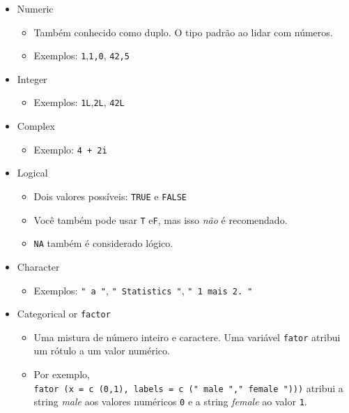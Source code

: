 \documentclass[
]{book}
\providecommand{\tightlist}{%
  \setlength{\itemsep}{0pt}\setlength{\parskip}{0pt}}
\theoremstyle{definition}
\theoremstyle{definition}
\theoremstyle{definition}
\theoremstyle{remark}
\begin{document}
\begin{itemize}
\tightlist
\item
  Numeric

  \begin{itemize}
  \tightlist
  \item
    Também conhecido como duplo. O tipo padrão ao lidar com números.
  \item
    Exemplos: \texttt{1},\texttt{1,0}, \texttt{42,5}
  \end{itemize}
\item
  Integer

  \begin{itemize}
  \tightlist
  \item
    Exemplos: \texttt{1L},\texttt{2L}, \texttt{42L}
  \end{itemize}
\item
  Complex

  \begin{itemize}
  \tightlist
  \item
    Exemplo: \texttt{4\ +\ 2i}
  \end{itemize}
\item
  Logical

  \begin{itemize}
  \tightlist
  \item
    Dois valores possíveis: \texttt{TRUE} e \texttt{FALSE}
  \item
    Você também pode usar \texttt{T} e\texttt{F}, mas isso \emph{não} é recomendado.
  \item
    \texttt{NA} também é considerado lógico.
  \end{itemize}
\item
  Character

  \begin{itemize}
  \tightlist
  \item
    Exemplos: \texttt{"\ a\ "}, \texttt{"\ Statistics\ "}, \texttt{"\ 1\ mais\ 2.\ "}
  \end{itemize}
\item
  Categorical or \texttt{factor}

  \begin{itemize}
  \tightlist
  \item
    Uma mistura de número inteiro e caractere. Uma variável \texttt{fator} atribui um rótulo a um valor numérico.
  \item
    Por exemplo, \texttt{fator\ (x\ =\ c\ (0,1),\ labels\ =\ c\ ("\ male\ ","\ female\ ")))} atribui a string \emph{male} aos valores numéricos \texttt{0} e a string \emph{female} ao valor \texttt{1}.
  \end{itemize}
\end{itemize}
\end{document}
